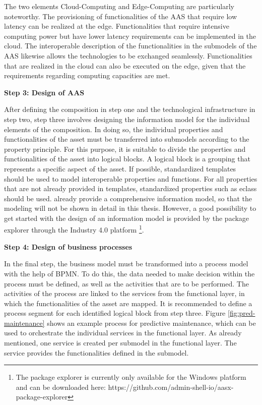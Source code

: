 The two elements Cloud-Computing and Edge-Computing are particularly noteworthy. The provisioning of functionalities of the \ac{AAS} that require low latency can be realized at the edge. Functionalities that require intensive computing power but have lower latency requirements can be implemented in the cloud. The interoperable description of the functionalities in the submodels of the \ac{AAS} likewise allows the technologies to be exchanged seamlessly. Functionalities that are realized in the cloud can also be executed on the edge, given that the requirements regarding computing capacities are met.

\textbf{Step 3: Design of \ac{AAS}}

After defining the composition in step one and the technological infrastructure in step two, step three involves designing the information model for the individual elements of the composition. In doing so, the individual properties and functionalities of the asset must be transferred into submodels according to the property principle. For this purpose, it is suitable to divide the properties and functionalities of the asset into logical blocks. A logical block is a grouping that represents a specific aspect of the asset. If possible, standardized templates should be used to model interoperable properties and functions. For all properties that are not already provided in templates, standardized properties such as eclass should be used. \citet[p. 8, 10]{Cavalieri2020AShell} already provide a comprehensive information model, so that the modeling will not be shown in detail in this thesis.  However, a good possibility to get started with the design of an information model is provided by the package explorer through the Industry 4.0 platform \footnote{The package explorer is currently only available for the Windows platform and can be downloaded here: https://github.com/admin-shell-io/aasx-package-explorer}.

\textbf{Step 4: Design of business processes}

In the final step, the business model must be transformed into a process model with the help of \ac{BPMN}. To do this, the data needed to make decision within the process must be defined, as well as the activities that are to be performed. The activities of the process are linked to the services from the functional layer, in which the functionalities of the asset are mapped. It is recommended to define a process segment for each identified logical block from step three. Figure \ref{fig:pred-maintenance} shows an example process for predictive maintenance, which can be used to orchestrate the individual services in the functional layer. As already mentioned, one service is created per submodel in the functional layer. The service provides the functionalities defined in the submodel. 

